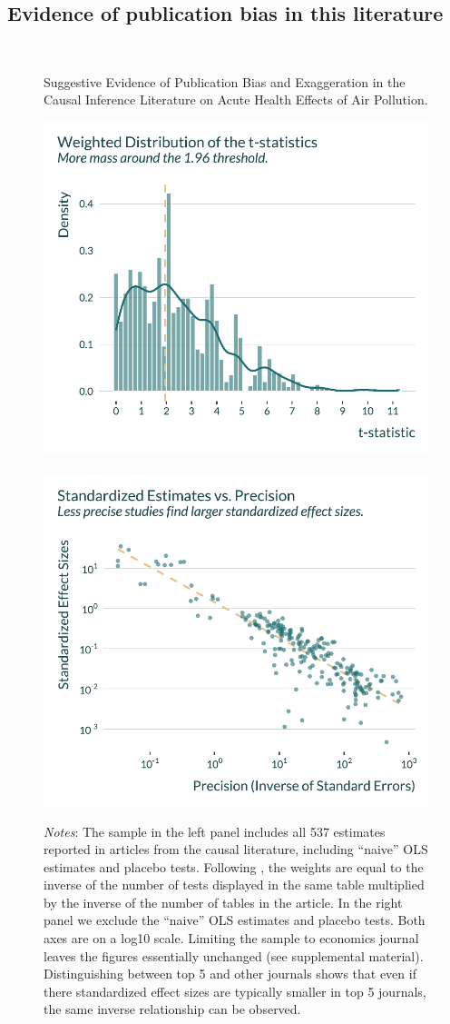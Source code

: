 \documentclass[usletter, 12pt]{article}
\begin{document}
		 
		 \subsection{Evidence of publication bias in this literature}
		 ~
		 
		  \begin{figure}[h!]
                   	\caption{Suggestive Evidence of Publication Bias and Exaggeration in the Causal Inference Literature on Acute Health Effects of Air Pollution.}
                        \label{fig:intro}
                    	\centering
                    	\includegraphics[width=0.48\linewidth]{images/graph_distribution_t.pdf} \ 
                    	\includegraphics[width=0.48\linewidth]{images/graph_effect_precision.pdf}
                   	 \caption*{\footnotesize \textnormal{\textit{Notes}:  The sample in the left panel includes all 537 estimates reported in articles from the causal literature, including ``naive'' OLS estimates and placebo tests. Following \cite{brodeur_methods_2020}, the weights are equal to the inverse of the number of tests displayed in the same table multiplied by the inverse of the number of tables in the article. In the right panel we exclude the ``naive''  OLS estimates and placebo tests. Both axes are on a log10 scale. Limiting the sample to economics journal leaves the figures essentially unchanged (see  supplemental material). Distinguishing between top 5 and other journals shows that even if there  standardized effect sizes are typically smaller in top 5 journals, the same inverse relationship can be observed.}}
                \end{figure}
                
\end{document}
